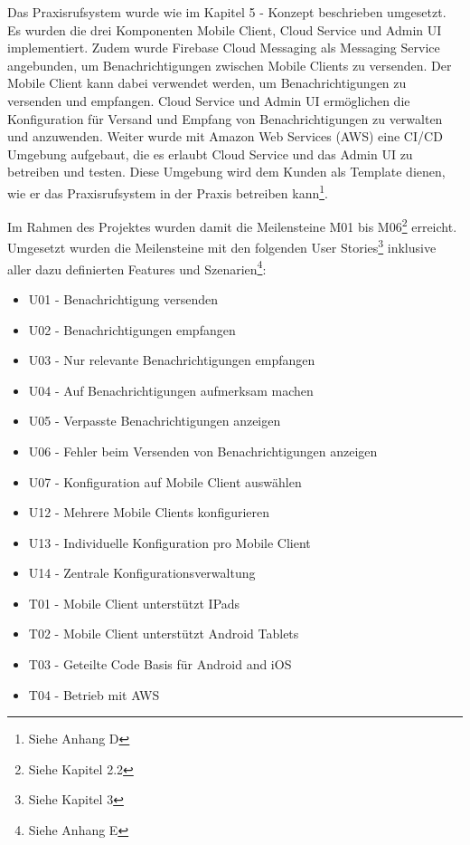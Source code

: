 Das Praxisrufsystem wurde wie im Kapitel 5 - Konzept beschrieben umgesetzt.
Es wurden die drei Komponenten Mobile Client, Cloud Service und Admin UI implementiert.
Zudem wurde Firebase Cloud Messaging als Messaging Service angebunden, um Benachrichtigungen zwischen Mobile Clients zu versenden.
Der Mobile Client kann dabei verwendet werden, um Benachrichtigungen zu versenden und empfangen.
Cloud Service und Admin UI ermöglichen die Konfiguration für Versand und Empfang von Benachrichtigungen zu verwalten und anzuwenden.
Weiter wurde mit Amazon Web Services (AWS) eine CI/CD Umgebung aufgebaut, die es erlaubt Cloud Service und das Admin UI zu betreiben und testen.
Diese Umgebung wird dem Kunden als Template dienen, wie er das Praxisrufsystem in der Praxis betreiben kann\footnote{Siehe Anhang D}.

Im Rahmen des Projektes wurden damit die Meilensteine M01 bis M06\footnote{Siehe Kapitel 2.2} erreicht.
Umgesetzt wurden die Meilensteine mit den folgenden User Stories\footnote{Siehe Kapitel 3} inklusive aller dazu definierten Features und Szenarien\footnote{Siehe Anhang E}:

\begin{itemize}
    \item U01 - Benachrichtigung versenden
    \item U02 - Benachrichtigungen empfangen
    \item U03 - Nur relevante Benachrichtigungen empfangen
    \item U04 - Auf Benachrichtigungen aufmerksam machen
    \item U05 - Verpasste Benachrichtigungen anzeigen
    \item U06 - Fehler beim Versenden von Benachrichtigungen anzeigen
    \item U07 - Konfiguration auf Mobile Client auswählen
    \item U12 - Mehrere Mobile Clients konfigurieren
    \item U13 - Individuelle Konfiguration pro Mobile Client
    \item U14 - Zentrale Konfigurationsverwaltung
    \item T01 - Mobile Client unterstützt IPads
    \item T02 - Mobile Client unterstützt Android Tablets
    \item T03 - Geteilte Code Basis für Android and iOS
    \item T04 - Betrieb mit AWS
\end{itemize}

